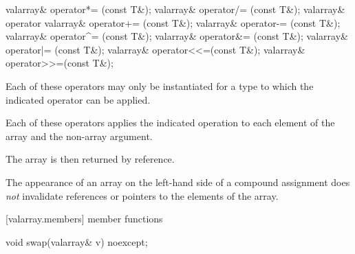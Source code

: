 %
%
%
%
%
%
%
%
%
%
%
%
%
%
%
%
%
%
%
%
\begin{itemdecl}
valarray& operator*= (const T&);
valarray& operator/= (const T&);
valarray& operator%
valarray& operator+= (const T&);
valarray& operator-= (const T&);
valarray& operator^= (const T&);
valarray& operator&= (const T&);
valarray& operator|= (const T&);
valarray& operator<<=(const T&);
valarray& operator>>=(const T&);
\end{itemdecl}

\begin{itemdescr}
\pnum
Each of these operators may only be instantiated for a type 
to which the indicated operator can be applied.

\pnum
Each of these operators applies the indicated operation to each element
of the array and the non-array argument.

\pnum
The array is then returned by reference.

\pnum
The appearance of an array on the left-hand side of a compound assignment
does
\textit{not}
invalidate references or pointers to the elements of the array.
\end{itemdescr}

[valarray.members]{ member functions}

%
%
\begin{itemdecl}
void swap(valarray& v) noexcept;
\end{itemdecl}

